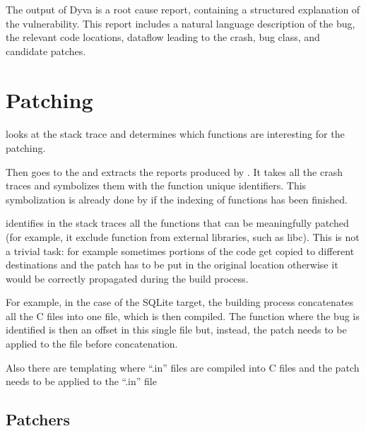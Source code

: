 The output of Dyva is a root cause report, containing a structured explanation of the vulnerability.
This report includes a natural language description of the bug, the relevant code locations, dataflow leading to the crash, bug class, and candidate patches.

\section{Patching}
\label{patching}



\paragraph{\poiguy}

\poiguy looks at the stack trace and determines which functions are interesting for the patching.

Then \poiguy goes to the \analysisgraph and extracts the reports produced by \povguy.
It takes all the crash traces and symbolizes them with the function unique identifiers.
This symbolization is already done by \povguy if the indexing of functions has been finished.

\poiguy identifies in the stack traces all the functions that can be meaningfully patched (for example, it exclude function from external libraries, such as libc).
This is not a trivial task: for example sometimes portions of the code get copied to different destinations and the patch has to be put in the original location otherwise it would be correctly propagated during the build process.

For example, in the case of the SQLite target, the building process concatenates all the C files into one file, which is then compiled. The function where the bug is identified is then an offset in this single file but, instead, the patch needs to be applied to the file before concatenation.

Also there are templating where ``.in'' files are compiled into C files and the patch needs to be applied to the ``.in'' file


\subsection{Patchers}

